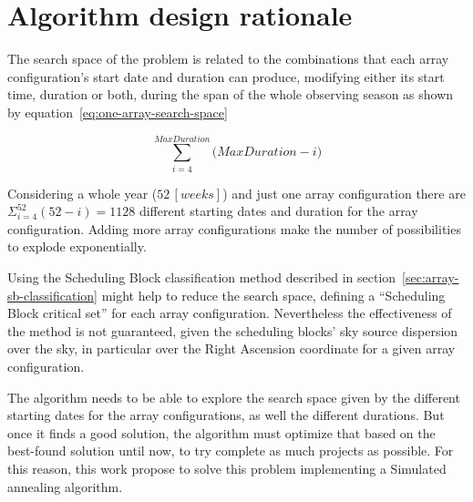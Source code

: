 \section{Algorithm design rationale}
The search space of the problem is related to the combinations that each array configuration's start date and duration can produce, modifying either its start time, duration or both, during the span of the whole observing season as shown by equation~\ref{eq:one-array-search-space}

\begin{equation}
\label{eq:one-array-search-space}
\sum_{i=4}^{MaxDuration} \Big(MaxDuration - i\Big) 
\end{equation}

Considering a whole year ($52\,[weeks]$) and just one array configuration there are $\Sigma_{i=4}^{52} (52 - i) = 1128$ different starting dates and duration for the array configuration. Adding more array configurations make the number of possibilities to explode exponentially.

Using the Scheduling Block classification method described in section~\ref{sec:array-sb-classification} might help to reduce the search space, defining a ``Scheduling Block critical set'' for each array configuration.
Nevertheless the effectiveness of the method is not guaranteed, given the scheduling blocks' sky source dispersion over the sky, in particular over the Right Ascension coordinate for a given array configuration.

The algorithm needs to be able to explore the search space given by the different starting dates for the array configurations, as well the different durations. But once it finds a good solution, the algorithm must optimize that based on the best-found solution until now, to try complete as much projects as possible. For this reason, this work propose to solve this problem implementing a Simulated annealing algorithm.

